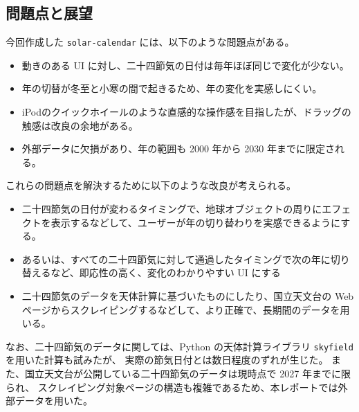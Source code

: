 \documentclass[a4paper]{jlreq}
\begin{document}
\subsection*{問題点と展望}

今回作成した \texttt{solar-calendar} には、以下のような問題点がある。

\begin{itemize}
    \item 動きのある UI に対し、二十四節気の日付は毎年ほぼ同じで変化が少ない。
    \item 年の切替が冬至と小寒の間で起きるため、年の変化を実感しにくい。
    \item iPodのクイックホイールのような直感的な操作感を目指したが、ドラッグの触感は改良の余地がある。
    \item 外部データに欠損があり、年の範囲も 2000 年から 2030 年までに限定される。
\end{itemize}

これらの問題点を解決するために以下のような改良が考えられる。

\begin{itemize}
    \item 二十四節気の日付が変わるタイミングで、地球オブジェクトの周りにエフェクトを表示するなどして、ユーザーが年の切り替わりを実感できるようにする。
    \item あるいは、すべての二十四節気に対して通過したタイミングで次の年に切り替えるなど、即応性の高く、変化のわかりやすい UI にする
    \item 二十四節気のデータを天体計算に基づいたものにしたり、国立天文台の Web ページからスクレイピングするなどして、より正確で、長期間のデータを用いる。
\end{itemize}

なお、二十四節気のデータに関しては、Python の天体計算ライブラリ \texttt{skyfield} を用いた計算も試みたが、
実際の節気日付とは数日程度のずれが生じた。
また、国立天文台が公開している二十四節気のデータは現時点で 2027 年までに限られ、
スクレイピング対象ページの構造も複雑であるため、本レポートでは外部データを用いた。
\end{document}
